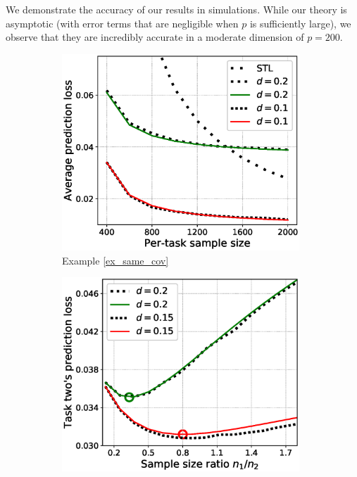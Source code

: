 {\begin{example}
\end{example}



We demonstrate the accuracy of our results in simulations.
While our theory is asymptotic (with error terms that are negligible when $p$ is sufficiently large), we observe that they are incredibly accurate in a moderate dimension of $p = 200$.


\begin{figure}[!t]
	\begin{subfigure}[b]{0.33\textwidth}
		\centering
		\includegraphics[width=0.98\textwidth]{figures/same_covariates.eps}
		\caption{Example \ref{ex_same_cov}}
		\label{fig_same_cov}
	\end{subfigure}\hfill
	\begin{subfigure}[b]{0.33\textwidth}
		\centering
		\includegraphics[width=0.98\textwidth]{figures/sample_ratio_several_d.eps}

\end{subfigure}
\end{figure}}
